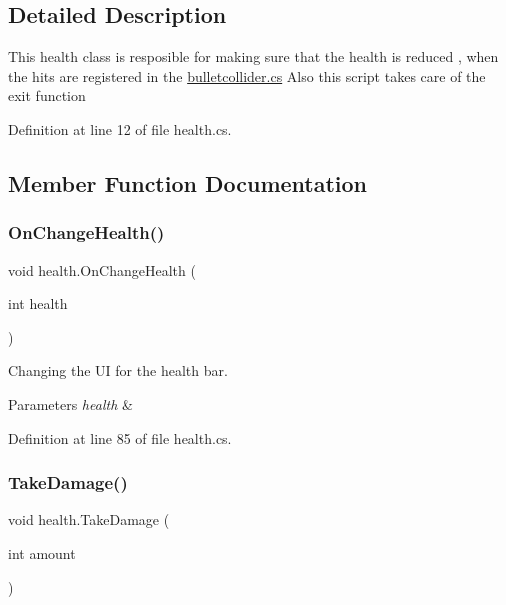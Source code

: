 \subsection{Detailed Description}
This health class is resposible for making sure that the health is reduced , when the hits are registered in the \mbox{\hyperlink{bulletcollider_8cs}{bulletcollider.\+cs}} Also this script takes care of the exit function 



Definition at line 12 of file health.\+cs.



\subsection{Member Function Documentation}
\mbox{\label{classhealth_a63f6a51cc26465e3a46eb81a578bcf1d}} 
\subsubsection{\texorpdfstring{OnChangeHealth()}{OnChangeHealth()}}
{\footnotesize\ttfamily void health.\+On\+Change\+Health (\begin{DoxyParamCaption}\item[{int}]{health }\end{DoxyParamCaption})}



Changing the UI for the health bar. 


\begin{DoxyParams}{Parameters}
{\em health} & \\
\hline
\end{DoxyParams}


Definition at line 85 of file health.\+cs.

\mbox{\label{classhealth_a7356a64035ee03262ec7fca1af42eff1}} 
\subsubsection{\texorpdfstring{TakeDamage()}{TakeDamage()}}
{\footnotesize\ttfamily void health.\+Take\+Damage (\begin{DoxyParamCaption}\item[{int}]{amount }\end{DoxyParamCaption})}



